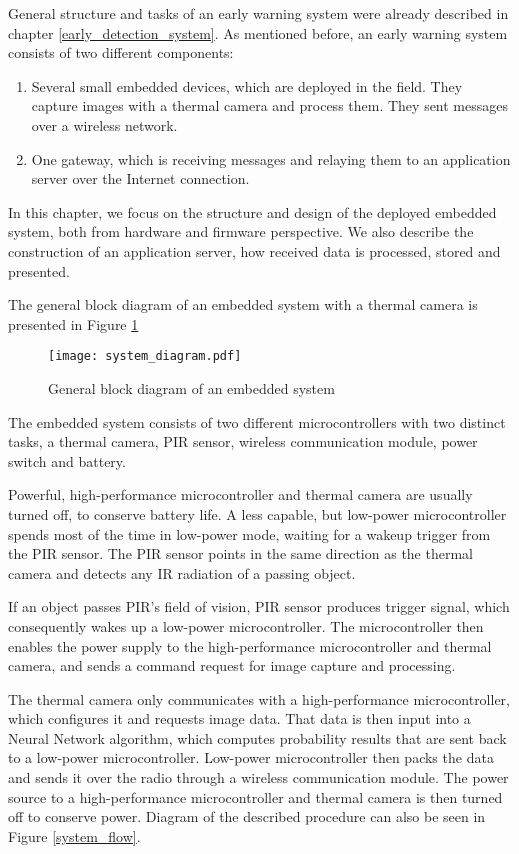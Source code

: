 General structure and tasks of an early warning system were already described in chapter \ref{early_detection_system}.
As mentioned before, an early warning system consists of two different components:

\begin{enumerate} 
    \item Several small embedded devices, which are deployed in the field. They capture images with a thermal camera and process them. They sent messages over a wireless network.
    \item One gateway, which is receiving messages and relaying them to an application server over the Internet connection.
\end{enumerate} 

In this chapter, we focus on the structure and design of the deployed embedded system, both from hardware and firmware perspective.
We also describe the construction of an application server, how received data is processed, stored and presented.

The general block diagram of an embedded system with a thermal camera is presented in Figure \ref{system_diagram} 

\begin{figure}[ht]
        \centering
        \texttt{[image: system\_diagram.pdf]} 
        \caption{ General block diagram of an embedded system}
        \label{system_diagram}
\end{figure}

The embedded system consists of two different microcontrollers with two distinct tasks, a thermal camera, PIR sensor, wireless communication module, power switch and battery.

Powerful, high-performance microcontroller and thermal camera are usually turned off, to conserve battery life.
A less capable, but low-power microcontroller spends most of the time in low-power mode, waiting for a wakeup trigger from the PIR sensor.
The PIR sensor points in the same direction as the thermal camera and detects any IR radiation of a passing object.

If an object passes PIR's field of vision, PIR sensor produces trigger signal, which consequently wakes up a low-power microcontroller.
The microcontroller then enables the power supply to the high-performance microcontroller and thermal camera, and sends a command request for image capture and processing.

The thermal camera only communicates with a high-performance microcontroller, which configures it and requests image data.
That data is then input into a Neural Network algorithm, which computes probability results that are sent back to a low-power microcontroller.
Low-power microcontroller then packs the data and sends it over the radio through a wireless communication module.
The power source to a high-performance microcontroller and thermal camera is then turned off to conserve power.
Diagram of the described procedure can also be seen in Figure \ref{system_flow}.

